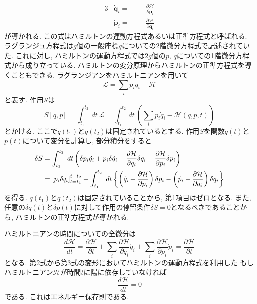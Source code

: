 \begin{alignat}{3}
 & \dot{\bm{q}}_{i}
 =&& \frac{\partial \mathcal{H}}{\partial \bm{p}_{i}}
 \\
 & \dot{\bm{p}}_{i}
 =-&&\frac{\partial \mathcal{H}}{\partial \bm{q}_{i}}
\end{alignat}
が導かれる.
この式はハミルトンの運動方程式あるいは正準方程式と呼ばれる.
ラグランジュ方程式は$g$個の一般座標$q$についての2階微分方程式で記述されていた.
これに対し, ハミルトンの運動方程式では$2g$個の$p$, $q$についての1階微分方程式から成り立っている.
ハミルトンの変分原理からハミルトンの正準方程式を導くこともできる.
ラグランジアンをハミルトニアンを用いて
\begin{equation}
 \mathcal{L} = \sum_{i} p_{i} \dot{q}_{i} - \mathcal{H}
\end{equation}
と表す. 作用$S$は
\begin{equation}
 S[q, p]
=\int_{t_{1}}^{t_{2}}~ dt~\mathcal{L}
=\int_{t_{1}}^{t_{2}}~ dt~ \left(\sum_{i} p_{i} \dot{q}_{i} - \mathcal{H}(q, p, t) \right)
\end{equation}
とかける.
ここで$q(t_{1})$と$q(t_{2})$は固定されているとする.
作用$S$を関数$q(t)$と$p(t)$について変分を計算し, 部分積分をすると
\begin{align}
 \delta S
&=\int_{t_{1}}^{t_{2}}~dt
  \left(
         \delta p_{i} \dot{q_{i}} + p_{i} \delta \dot{q_{i}}
        -\frac{\partial \mathcal{H}}{\partial q_{i}} \delta q_{i}
        -\frac{\partial \mathcal{H}}{\partial p_{i}} \delta p_{i}
  \right)
  \notag
  \\
&=\left[p_{i} \delta q_{i}\right]_{t=t_{1}}^{t=t_{2}}
 +\int_{t_{1}}^{t_{2}} ~dt
  \left\{
          \left(\dot{q}_{i} - \frac{\partial \mathcal{H}}{\partial p_{i}} \right) \delta p_{i}
         -\left(\dot{p}_{i} - \frac{\partial \mathcal{H}}{\partial q_{i}} \right) \delta q_{i}
  \right\}
\end{align}
を得る.
$q(t_{1})$と$q(t_{2})$は固定されていることから, 第1項目はゼロとなる.
また, 任意の$\delta q(t)$と$\delta p(t)$に対して作用の停留条件$\delta S = 0$となるべきであることから,
ハミルトンの正準方程式が導かれる.

ハミルトニアンの時間についての全微分は
\begin{equation}
 \frac{d \mathcal{H}}{d t}
=\frac{\partial \mathcal{H}}{\partial t}
+\sum_{i}\frac{\partial \mathcal{H}}{\partial q_{i}} \dot{q}_{i}
+\sum_{i}\frac{\partial \mathcal{H}}{\partial p_{i}} \dot{p}_{i}
=\frac{\partial \mathcal{H}}{\partial t}
\end{equation}
となる.
第2式から第3式の変形においてハミルトンの運動方程式を利用した
もしハミルトニアン$\mathcal{H}$が時間$t$に陽に依存していなければ
\begin{equation}
 \frac{d \mathcal{H}}{dt} = 0
\end{equation}
である. これはエネルギー保存則である.


